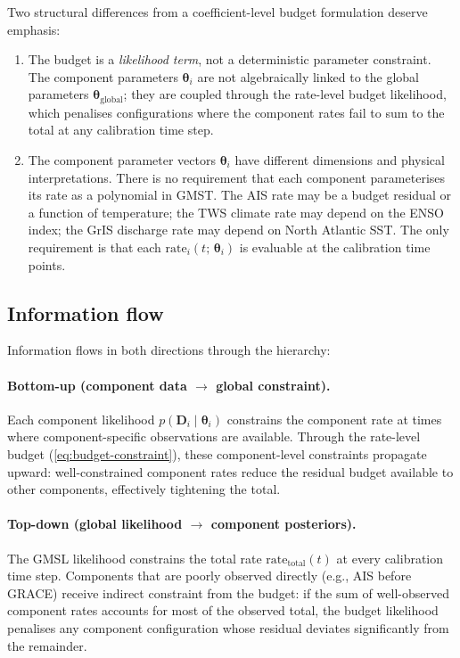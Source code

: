 \documentclass[11pt]{article}
\newcommand{\CDW}{\text{CDW}}
\begin{document}
Two structural differences from a coefficient-level budget formulation deserve emphasis:
\begin{enumerate}
  \item The budget is a \emph{likelihood term}, not a deterministic parameter constraint.  The component parameters $\boldsymbol{\theta}_i$ are not algebraically linked to the global parameters $\boldsymbol{\theta}_{\text{global}}$; they are coupled through the rate-level budget likelihood, which penalises configurations where the component rates fail to sum to the total at any calibration time step.
  \item The component parameter vectors $\boldsymbol{\theta}_i$ have different dimensions and physical interpretations.  There is no requirement that each component parameterises its rate as a polynomial in GMST.  The AIS rate may be a budget residual or a function of \CDW{} temperature; the TWS climate rate may depend on the ENSO index; the GrIS discharge rate may depend on North Atlantic SST.  The only requirement is that each $\text{rate}_i(t;\, \boldsymbol{\theta}_i)$ is evaluable at the calibration time points.
\end{enumerate}

\subsection{Information flow}

Information flows in both directions through the hierarchy:

\paragraph{Bottom-up (component data $\to$ global constraint).}  Each component likelihood $p(\mathbf{D}_i \mid \boldsymbol{\theta}_i)$ constrains the component rate at times where component-specific observations are available.  Through the rate-level budget (\cref{eq:budget-constraint}), these component-level constraints propagate upward: well-constrained component rates reduce the residual budget available to other components, effectively tightening the total.

\paragraph{Top-down (global likelihood $\to$ component posteriors).}  The GMSL likelihood constrains the total rate $\text{rate}_{\text{total}}(t)$ at every calibration time step.  Components that are poorly observed directly (e.g., AIS before GRACE) receive indirect constraint from the budget: if the sum of well-observed component rates accounts for most of the observed total, the budget likelihood penalises any component configuration whose residual deviates significantly from the remainder.
\end{document}
